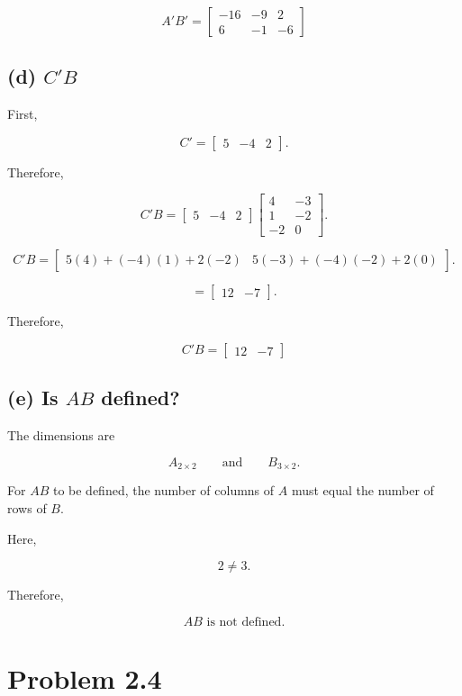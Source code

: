 \documentclass[12pt]{article}
\begin{document}
\[
\boxed{
A'B'
=
\begin{bmatrix}
-16 & -9 & 2 \\
6 & -1 & -6
\end{bmatrix}
}
\]

\subsection*{(d) $C'B$}

First,

\[
C'
=
\begin{bmatrix}
5 & -4 & 2
\end{bmatrix}.
\]

Therefore,

\[
C'B
=
\begin{bmatrix}
5 & -4 & 2
\end{bmatrix}
\begin{bmatrix}
4 & -3 \\
1 & -2 \\
-2 & 0
\end{bmatrix}.
\]

\[
C'B
=
\begin{bmatrix}
5(4)+(-4)(1)+2(-2) &
5(-3)+(-4)(-2)+2(0)
\end{bmatrix}.
\]

\[
=
\begin{bmatrix}
12 & -7
\end{bmatrix}.
\]

Therefore,

\[
\boxed{
C'B =
\begin{bmatrix}
12 & -7
\end{bmatrix}
}
\]

\subsection*{(e) Is $AB$ defined?}

The dimensions are

\[
A_{2\times2}
\qquad\text{and}\qquad
B_{3\times2}.
\]

For $AB$ to be defined, the number of columns of $A$ must equal the number of rows of $B$.

Here,

\[
2 \neq 3.
\]

Therefore,

\[
\boxed{AB\text{ is not defined}.}
\]


\section*{Problem 2.4}
\end{document}
